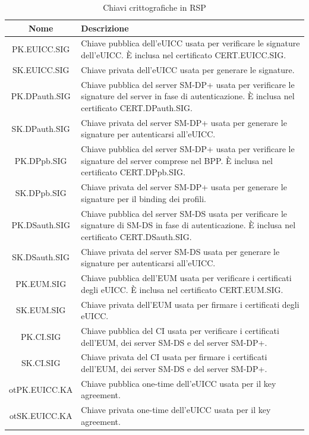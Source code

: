 \documentclass[10pt, oneside]{book}
\begin{document}
\begin{table}[h!]
\begin{center}
\captionsetup{skip=4pt}
\caption{Chiavi crittografiche in RSP}
\label{tab:keys}
\begin{tabularx}{\textwidth}{|c|X|}
\hline
\textbf{Nome} & \textbf{Descrizione}\\
\hline
PK.EUICC.SIG & Chiave pubblica dell'eUICC usata per verificare le signature dell'eUICC. È inclusa nel certificato CERT.EUICC.SIG.\\
\hline
SK.EUICC.SIG & Chiave privata dell'eUICC usata per generare le signature.\\
\hline
PK.DPauth.SIG & Chiave pubblica del server SM-DP+ usata per verificare le signature del server in fase di autenticazione. È inclusa nel certificato CERT.DPauth.SIG.\\
\hline
SK.DPauth.SIG & Chiave privata del server SM-DP+ usata per generare le signature per autenticarsi all'eUICC.\\
\hline
PK.DPpb.SIG & Chiave pubblica del server SM-DP+ usata per verificare le signature del server comprese nel BPP.  È inclusa nel certificato CERT.DPpb.SIG.\\
\hline
SK.DPpb.SIG & Chiave privata del server SM-DP+ usata per generare le signature per il binding dei profili.\\
\hline
PK.DSauth.SIG & Chiave pubblica del server SM-DS usata per verificare le signature di SM-DS in fase di autenticazione. È inclusa nel certificato CERT.DSauth.SIG.\\
\hline
SK.DSauth.SIG & Chiave privata del server SM-DS usata per generare le signature per autenticarsi all'eUICC.\\
\hline
PK.EUM.SIG & Chiave pubblica dell'EUM usata per verificare i certificati degli eUICC. È inclusa nel certificato CERT.EUM.SIG.\\
\hline
SK.EUM.SIG & Chiave privata dell'EUM usata per firmare i certificati degli eUICC.\\
\hline
PK.CI.SIG &  Chiave pubblica del CI usata per verificare i certificati dell'EUM, dei server SM-DS e del server SM-DP+.\\
\hline
SK.CI.SIG & Chiave privata del CI usata per firmare i certificati dell'EUM, dei server SM-DS e del server SM-DP+.\\
\hline
otPK.EUICC.KA & Chiave pubblica one-time dell'eUICC usata per il key agreement.\\
\hline
otSK.EUICC.KA & Chiave privata one-time dell'eUICC usata per il key agreement.\\

\end{tabularx}
\end{center}
\end{table}
\end{document}
